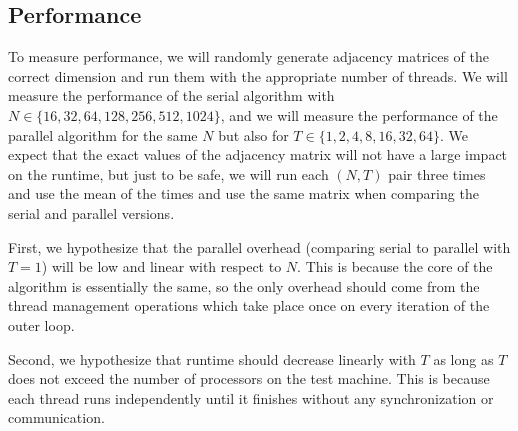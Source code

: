 \documentclass{article}
\begin{document}
\subsection*{Performance}
To measure performance, we will randomly generate adjacency matrices of the correct dimension and run them with the appropriate number of threads. We will measure the performance of the serial algorithm with $N\in\{16,32,64,128,256,512,1024\}$, and we will measure the performance of the parallel algorithm for the same $N$ but also for $T\in\{1,2,4,8,16,32,64\}$. We expect that the exact values of the adjacency matrix will not have a large impact on the runtime, but just to be safe, we will run each $(N,T)$ pair three times and use the mean of the times and use the same matrix when comparing the serial and parallel versions.

First, we hypothesize that the parallel overhead (comparing serial to parallel with $T=1$) will be low and linear with respect to $N$. This is because the core of the algorithm is essentially the same, so the only overhead should come from the thread management operations which take place once on every iteration of the outer loop.

Second, we hypothesize that runtime should decrease linearly with $T$ as long as $T$ does not exceed the number of processors on the test machine. This is because each thread runs independently until it finishes without any synchronization or communication.
\end{document}
